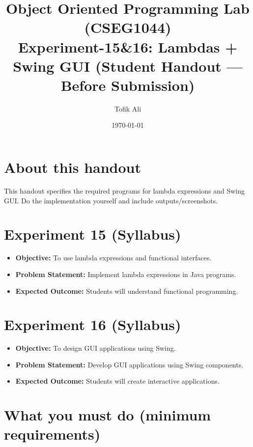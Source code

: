\documentclass[11pt]{article}
\title{Object Oriented Programming Lab (CSEG1044)\\Experiment-15\&16: Lambdas + Swing GUI (Student Handout --- Before Submission)}
\author{Tofik Ali}
\date{\today}
\begin{document}
\maketitle
\tableofcontents

\section{About this handout}
This handout specifies the required programs for lambda expressions and Swing GUI.
Do the implementation yourself and include outputs/screenshots.

\section{Experiment 15 (Syllabus)}
\begin{itemize}[leftmargin=*]
  \item \textbf{Objective:} To use lambda expressions and functional interfaces.
  \item \textbf{Problem Statement:} Implement lambda expressions in Java programs.
  \item \textbf{Expected Outcome:} Students will understand functional programming.
\end{itemize}

\section{Experiment 16 (Syllabus)}
\begin{itemize}[leftmargin=*]
  \item \textbf{Objective:} To design GUI applications using Swing.
  \item \textbf{Problem Statement:} Develop GUI applications using Swing components.
  \item \textbf{Expected Outcome:} Students will create interactive applications.
\end{itemize}

\section{What you must do (minimum requirements)}
\end{document}
